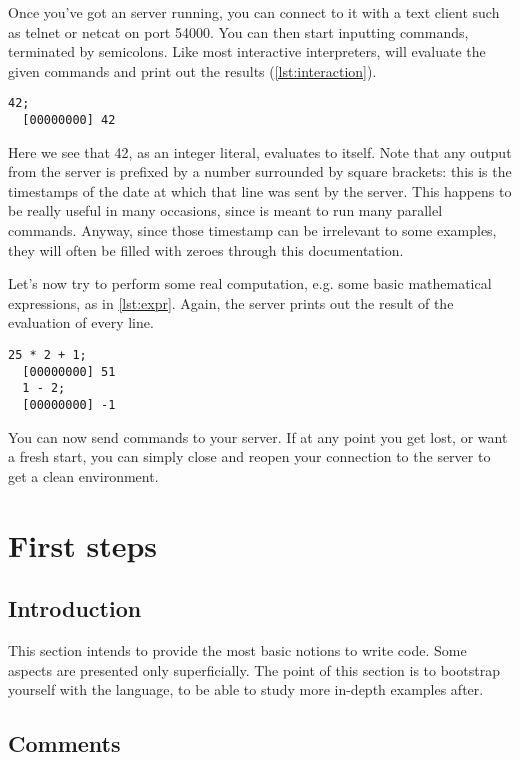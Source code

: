 \documentclass[openright,twoside,12pt]{report}
\newcommand{\lst}[1]{\autoref{lst:#1}}
\begin{document}
Once you've got an \urbi server running, you can connect to it with a
text client such as telnet or netcat on port 54000. You can then start
inputting commands, terminated by semicolons. Like most interactive
interpreters, \urbi will evaluate the given commands and print out the
results (\lst{interaction}).

\begin{lstlisting}[caption=Evaluating literal values,label=lst:interaction]
  42;
  [00000000] 42
\end{lstlisting}

Here we see that 42, as an integer literal, evaluates to itself. Note
that any output from the server is prefixed by a number surrounded by
square brackets: this is the timestamps of the date at which that line
was sent by the server. This happens to be really useful in many
occasions, since \urbi is meant to run many parallel commands. Anyway,
since those timestamp can be irrelevant to some examples, they will
often be filled with zeroes through this documentation.

Let's now try to perform some real computation, e.g. some basic
mathematical expressions, as in \lst{expr}. Again, the server prints
out the result of the evaluation of every line.

\begin{lstlisting}[caption=Evaluating composite expressions,label=lst:expr]
  25 * 2 + 1;
  [00000000] 51
  1 - 2;
  [00000000] -1
\end{lstlisting}

You can now send commands to your \urbi server. If at any point you
get lost, or want a fresh start, you can simply close and reopen your
connection to the server to get a clean environment.

\chapter{First steps}

\section{Introduction}

This section intends to provide the most basic notions to write \urbi
code. Some aspects are presented only superficially. The point of this
section is to bootstrap yourself with the \urbi language, to be able
to study more in-depth examples after.

\section{Comments}
\end{document}
